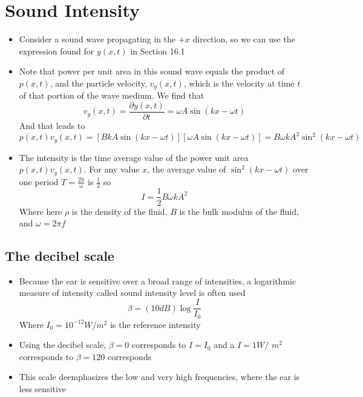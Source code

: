 \documentclass[11pt, a4paper]{article}
\begin{document}
\section[16.3, Sound Intensity]{Sound Intensity}
\begin{itemize}
    \item Consider a sound wave propagating in the $+x$ direction, so we can use the
        expression found for $y(x,t)$ in Section 16.1
    \item Note that power per unit area in this sound wave equals the product of
        $p(x,t)$, and the particle velocity, $v_y(x,t)$, which is the velocity at time
        $t$ of that portion of the wave medium. We find that
        \begin{equation}
            v_y(x,t) = \frac{\partial y(x,t)}{\partial t} = \omega A\sin(kx - \omega t)
        \end{equation}
        And that leads to
        \begin{equation}
            p(x,t)v_y(x,t) = [BkA\sin(kx - \omega t)][\omega A\sin(kx - \omega t)] =
            B\omega kA^{2}\sin^{2}(kx - \omega t)
        \end{equation}
    \item The intensity is the time average value of the power unit area
        $p(x,t)v_y(x,t)$. For any value $x$, the average value of $\sin^2(kx - \omega t)$
        over one period $T = \frac{2\pi}{\omega}$ is $\frac{1}{2}$ so
        \begin{equation}
            I = \frac{1}{2}B\omega kA^2
        \end{equation}
        Where here $\rho$ is the density of the fluid, $B$ is the bulk modulus of the
        fluid, and $\omega = 2\pi f$
\end{itemize}
\subsection{The decibel scale}
\begin{itemize}
    \item Because the ear is sensitive over a broad range of intensities, a logarithmic
        measure of intensity called sound intensity level is often used
        \begin{equation}
            \beta = (10 dB)\log \frac{I}{I_0}
        \end{equation}
        Where $I_0 = 10^{-12} W / m^2$ is the reference intensity
    \item Using the decibel scale, $\beta = 0$ corresponds to $I = I_0$ and a $I = 1W /$
        $m^2$ corresponds to $\beta = 120$
        corresponds
    \item This scale deemphasizes the low and very high frequencies, where the ear is
        less sensitive
\end{itemize}
\end{document}
